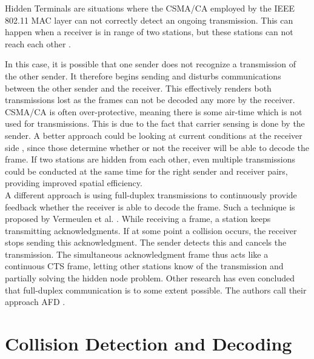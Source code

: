 Hidden Terminals are situations where the \gls{CSMA/CA} employed by the IEEE 802.11 MAC layer can not correctly detect an ongoing transmission. This can happen when a receiver is in range of two stations, but these stations can not reach each other \cite{perahia2013}.

In this case, it is possible that one sender does not recognize a transmission of the other sender. It therefore begins sending and disturbs communications between the other sender and the receiver. This effectively renders both transmissions lost as the frames can not be decoded any more by the receiver.\\

\gls{CSMA/CA} is often over-protective, meaning there is some air-time which is not used for transmissions. This is due to the fact that carrier sensing is done by the sender. A better approach could be looking at current conditions at the receiver side \cite{halperin2007}, since those determine whether or not the receiver will be able to decode the frame. If two stations are hidden from each other, even multiple transmissions could be conducted at the same time for the right sender and receiver pairs, providing improved spatial efficiency.\\

A different approach is using full-duplex transmissions to continuously provide feedback whether the receiver is able to decode the frame. Such a technique is proposed by Vermeulen et al. \cite{vermeulen2016}. While receiving a frame, a station keeps transmitting acknowledgments. If at some point a collision occurs, the receiver stops sending this acknowledgment. The sender detects this and cancels the transmission. The simultaneous acknowledgment frame thus acts like a continuous CTS frame, letting other stations know of the transmission and partially solving the hidden node problem. Other research has even concluded that full-duplex communication is to some extent possible. The authors call their approach \gls{AFD} \cite{lv2014}.



\section{Collision Detection and Decoding}

